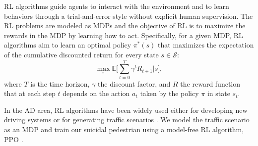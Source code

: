 \documentclass[letterpaper, 10 pt, conference]{ieeeconf}
\begin{document}
RL algorithms guide agents to interact with the environment and to learn behaviors through a trial-and-error style without explicit human supervision. %
The RL problems are modeled as MDPs and the objective of RL is to maximize the rewards in the MDP by learning how to act.
Specifically, for a given MDP, RL algorithms 
aim to learn an optimal policy $\pi^{*}(s)$ that maximizes the expectation of the cumulative discounted return for every state $s \in \mathcal{S}$:
\begin{equation}
    \max \limits_{\pi} \mathbb{E}\bigg [\sum^{T}_{t=0} \gamma^{t} R_{t+1} \bigg | s \bigg],
    \label{equation_Return}
\end{equation}
where $T$ is the time horizon, $\gamma$ the discount factor, and $R$ the reward function that at each step $t$ depends on the action $a_t$ taken by the policy $\pi$ in state $s_t$.



In the AD area, RL algorithms have been widely used either for developing new driving systems %
\cite{end_to_end_model_free_RL_driving, chen2021worldonrail} or for generating traffic scenarios \cite{adaptive_testing, adaptive_testing_augmentation, zero-shot}. %
We model the traffic scenario as an MDP and train our suicidal pedestrian using a model-free RL algorithm, PPO \cite{PPO}.
\end{document}

